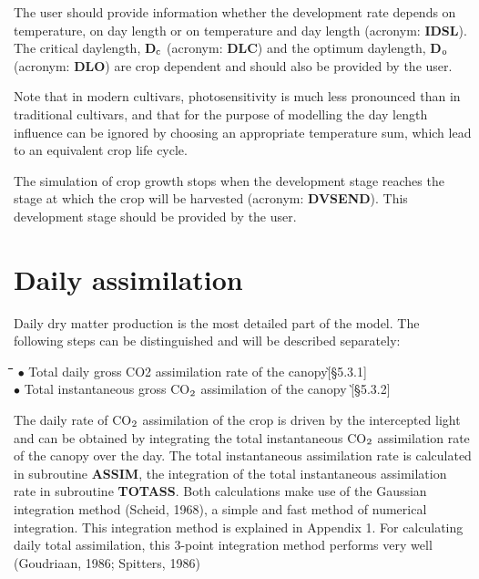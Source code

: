 The user should provide information whether the development rate depends on tempera\-ture, on day length or on temperature and day length (acronym: {\bf IDSL}). The critical
daylength, {\bf D$_{{\rm c}}$} (acronym: {\bf DLC}) and the optimum daylength, {\bf D$_{{\rm o}}$} (acronym: {\bf DLO}) are crop
depen\-dent and should also be provided by the user. 


Note that in modern cultivars, photosen\-sitivity is much less pronounced than in traditional
cultivars, and that for the purpose of modelling the day length influence can be ignored
by choosing an appropriate temperature sum, which lead to  an equivalent crop life cycle.


The simulation of crop growth stops when the development stage reaches the stage at
which the crop will be harvested (acronym: {\bf DVSEND}). This development stage should be
provided by the user. 



\newpage

\section{Daily assimilation  } 

Daily dry matter production is the most detailed part of the model. The following steps
can be distinguished and will be described separately:\nwln
\begin{tabbing}
\hspace{1.27cm}\=\hspace{1.27cm}\=\hspace{1.27cm}\=\hspace{1.27cm}\=%
\hspace{1.27cm}\=\hspace{1.27cm}\=\hspace{1.27cm}\=\hspace{1.27cm}\=%
\hspace{1.27cm}\=\hspace{1.27cm}\=\kill
$\bullet$  Total daily gross CO2 assimilation rate of the canopy\`[\S 5.3.1]\\
$\bullet$ Total instantaneous gross CO$_{{\rm 2}}$ assimilation of the canopy \`[\S 5.3.2]
\end{tabbing}

 
The daily rate of CO$_{{\rm 2}}$ assimilation of the crop is driven by the intercepted light and can
be obtained by integrating the total instanta\-neous CO$_{{\rm 2}}$ assimilation rate of the canopy over
the day. The total instantaneous assimilation rate is calculated in subrou\-tine {\bf ASSIM}, the
integra\-tion of the total instantaneous assimilation rate in subrou\-tine {\bf TOTASS}. Both
calcula\-tions make use of the Gaussian integration method (Scheid, 1968), a simple and
fast method of numerical integration. This integration method is explained in Appendix 1.
For calculat\-ing daily total assimilation, this 3-point integration method performs very well
(Goudria\-an, 1986; Spitters, 1986)




